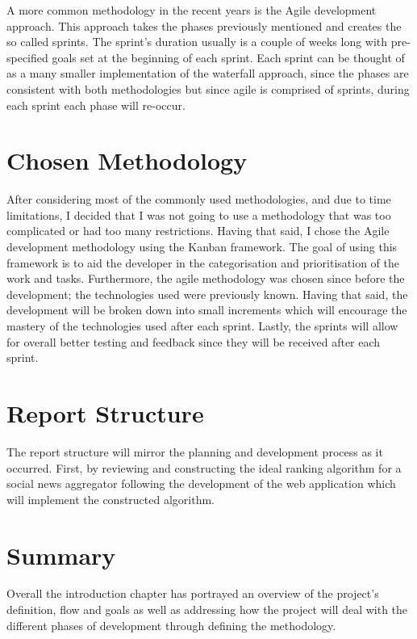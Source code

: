 A more common methodology in the recent years is the Agile development approach. This approach takes the phases previously mentioned and creates the so called sprints. The sprint's duration usually is a couple of weeks long with pre-specified goals set at the beginning of each sprint. Each sprint can be thought of as a many smaller implementation of the waterfall approach, since the phases are consistent with both methodologies but since agile is comprised of sprints, during each sprint each phase will re-occur.

\section{Chosen Methodology}
After considering most of the commonly used methodologies, and due to time limitations, I decided that I was not going to use a methodology that was too complicated or had too many restrictions. Having that said, I chose the Agile development methodology using the Kanban framework. The goal of using this framework is to aid the developer in the categorisation and prioritisation of the work and tasks. Furthermore, the agile methodology was chosen since before the development; the technologies used were previously known. Having that said, the development will be broken down into small increments which will encourage the mastery of the technologies used after each sprint. Lastly, the sprints will allow for overall better testing and feedback since they will be received after each sprint.

\section{Report Structure}
The report structure will mirror the planning and development process as it occurred. First, by reviewing and constructing the ideal ranking algorithm for a social news aggregator following the development of the web application which will implement the constructed algorithm.

\section{Summary}
Overall the introduction chapter has portrayed an overview of the project's definition, flow and goals as well as addressing how the project will deal with the different phases of development through defining the methodology.
